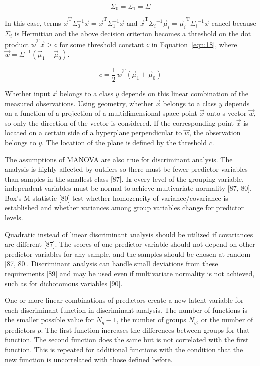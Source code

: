 \documentclass[preprint,12pt]{elsarticle}
\begin{document}
\begin{equation}
	\Sigma_{0}=\Sigma_{1}=\Sigma
	\label{eqn:17}
\end{equation}

In this case, terms ${\vec{x}}^{\mathrm{T}}\Sigma_{0}^{-1}{\vec{x}}={\vec{x}}^{\mathrm{T}}\Sigma_{1}^{-1}{\vec{x}}$ and ${\vec{x}}^{\mathrm{T}}{\Sigma_{i}}^{-1}{\vec{\mu}}_{i}={{\vec{\mu}}_{i}}^{\mathrm{T}}{\Sigma_{i}}^{-1}{\vec{x}}$ cancel because $\Sigma_{i}$ is Hermitian and the above decision criterion becomes a threshold on the dot product ${\vec{w}}^{\mathrm{T}}{\vec{x}}>c$ for some threshold constant $c$ in Equation~\ref{eqn:18}, where ${\vec{w}}=\Sigma ^{-1}({\vec{\mu}}_{1}-{\vec{\mu}}_{0})$.

\begin{equation}
	c={\frac{1}{2}}\,{\vec{w}}^{\mathrm{T}}({\vec{\mu}}_{1}+{\vec{\mu}}_{0})
	\label{eqn:18}
\end{equation}

Whether input $\vec{x}$ belongs to a class $y$ depends on this linear combination of the measured observations. Using geometry, whether $\vec{x}$ belongs to a class $y$ depends on a function of a projection of a multidimensional-space point $\vec{x}$ onto s vector $\vec{w}$, so only the direction of the vector is considered. If the corresponding point $\vec{x}$ is located on a certain side of a hyperplane perpendicular to $\vec{w}$, the observation belongs to $y$. The location of the plane is defined by the threshold $c$.

The assumptions of MANOVA are also true for discriminant analysis. The analysis is highly affected by outliers so there must be fewer predictor variables than samples in the smallest class [87]. In every level of the grouping variable, independent variables must be normal to achieve multivariate normality [87, 80]. Box's M statistic [80] test whether homogeneity of variance/covariance is established and whether variances among group variables change for predictor levels. 

Quadratic instead of linear discriminant analysis should be utilized if covariances are different [87]. The scores of one predictor variable should not depend on other predictor variables for any sample, and the samples should be chosen at random [87, 80]. Discriminant analysis can handle small deviations from these requirements [89] and may be used even if multivariate normality is not achieved, such as for dichotomous variables [90].

One or more linear combinations of predictors create a new latent variable for each discriminant function in discriminant analysis. The number of functions is the smaller possible value for $N_{g}-1$, the number of groups $N_{g}$, or the number of predictors $p$. The first function increases the differences between groups for that function. The second function does the same but is not correlated with the first function. This is repeated for additional functions with the condition that the new function is uncorrelated with those defined before.
\end{document}
